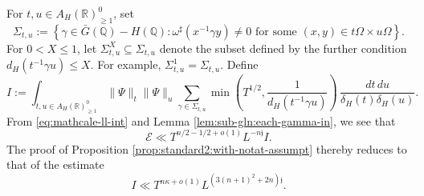 For $t, u \in A_H(\mathbb{R})^0_{\geq 1}$, set
\begin{equation*}
  \Sigma_{t,u} :=
  \left\{ \gamma \in \bar{G}(\mathbb{Q}) - H(\mathbb{Q}) : \text{$\omega^\sharp(x^{-1} \gamma y) \neq 0$ for some $(x,y) \in t \Omega \times u \Omega $} \right\}.
\end{equation*}
For $0 < X \leq 1$, let $\Sigma_{t,u}^X \subseteq \Sigma_{t,u}$ denote the subset defined by the further condition $d_H(t^{-1} \gamma u) \leq X$.  For example, $\Sigma_{t,u}^1 = \Sigma_{t,u}$.  Define
\begin{equation}\label{eq:i-:=-int}
  I := \int_{t, u \in A_H(\mathbb{R})^0_{\geq 1}} \|\Psi\|_t \|\Psi\|_u
  \sum_{\gamma \in \Sigma_{t,u}}
  \min \left( T^{1/2}, \frac{1}{d_H(t^{-1} \gamma u)} \right) \, \frac{d t \, d u}{\delta_H(t) \delta_H(u)}.
\end{equation}
From \eqref{eq:mathcale-ll-int} and Lemma \ref{lem:sub-gln:each-gamma-in}, we see that
\begin{equation*}
  \mathcal{E} \ll T^{n/2 - 1/2 + o(1)} L^{- n \mathfrak{j}} I.
\end{equation*}
The proof of Proposition \ref{prop:standard2:with-notat-assumpt} thereby reduces to that of the estimate
\begin{equation}\label{eq:i-ll-tnkappa}
  I \ll
  T^{n \kappa + o(1)}
  L^{(3 (n+1)^2  + 2 n) \mathfrak{j}}.
\end{equation}

